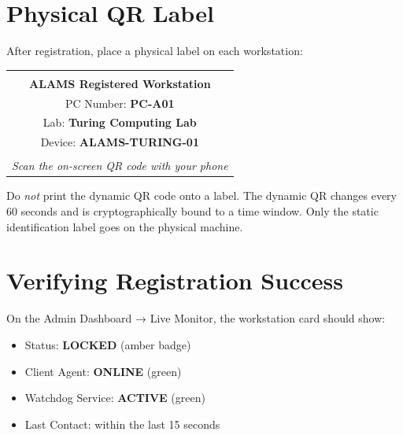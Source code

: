 \section{Physical QR Label}

After registration, place a physical label on each workstation:

\begin{tcolorbox}[alamsbox, title={\faTag\quad Physical Label Format (Per PC)}]
\begin{center}
\begin{tabular}{|c|}
\hline\\
\textbf{ALAMS Registered Workstation}\\[4pt]
PC Number: \textbf{PC-A01}\\
Lab: \textbf{Turing Computing Lab}\\
Device: \textbf{ALAMS-TURING-01}\\\\
\textit{Scan the on-screen QR code with your phone}\\[4pt]
\hline
\end{tabular}
\end{center}
\end{tcolorbox}

\begin{tcolorbox}[warningbox, title={\faExclamationTriangle\quad Important}]
Do \emph{not} print the dynamic QR code onto a label. The dynamic QR changes every 60 seconds and is cryptographically bound to a time window. Only the static identification label goes on the physical machine.
\end{tcolorbox}

\section{Verifying Registration Success}

On the Admin Dashboard → Live Monitor, the workstation card should show:
\begin{itemize}[label={\textcolor{aurxongreen}{\faCheckCircle}}]
  \item Status: \textbf{LOCKED} (amber badge)
  \item Client Agent: \textbf{ONLINE} (green)
  \item Watchdog Service: \textbf{ACTIVE} (green)
  \item Last Contact: within the last 15 seconds
\end{itemize}
